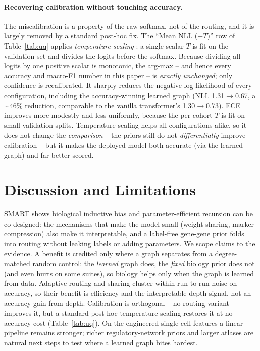 \documentclass[letterpaper]{article}
\begin{document}
\paragraph{Recovering calibration without touching accuracy.}
The miscalibration is a property of the raw softmax, not of the routing, and it is
largely removed by a standard post-hoc fix. The ``Mean NLL ($+T$)'' row of Table~\ref{tab:uq}
applies \emph{temperature scaling} \cite{guo2017calibration}: a single scalar $T$ is fit on
the validation set and divides the logits before the softmax. Because dividing all logits
by one positive scalar is monotonic, the arg-max -- and hence every accuracy and macro-F1
number in this paper -- is \emph{exactly unchanged}; only confidence is recalibrated. It
sharply reduces the negative log-likelihood of every configuration, including the
accuracy-winning learned graph (NLL 1.31$\to$0.67, a
$\sim$46\% reduction, comparable to the vanilla transformer's
1.30$\to$0.73). ECE improves more modestly and less uniformly,
because the per-cohort $T$ is fit on small validation splits. Temperature scaling helps
all configurations alike, so it does not change the \emph{comparison} -- the priors still
do not \emph{differentially} improve calibration -- but it makes the deployed model both
accurate (via the learned graph) and far better scored.


\section{Discussion and Limitations}
SMART shows biological inductive bias and parameter-efficient recursion can be co-designed:
the mechanisms that make the model small (weight sharing, marker compression) also make it
interpretable, and a label-free gene-gene prior folds into routing without leaking labels or
adding parameters. We scope claims to the evidence. A benefit is credited only where a graph
separates from a degree-matched random control: the \emph{learned} graph does, the
\emph{fixed} biology prior does not (and even hurts on some suites), so biology helps only
when the graph is learned from data. Adaptive routing and sharing cluster within run-to-run
noise on accuracy, so their benefit is efficiency and the interpretable depth signal, not an
accuracy gain from depth. Calibration is orthogonal -- no routing variant improves it, but a
standard post-hoc temperature scaling restores it at no accuracy cost (Table~\ref{tab:uq}).
On the engineered single-cell features a linear pipeline remains stronger; richer
regulatory-network priors and larger atlases are natural next steps to test where a learned
graph bites hardest.
\end{document}
